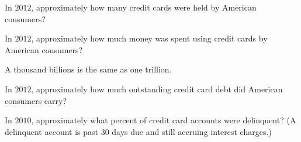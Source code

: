 \documentclass{ximera}
\begin{document}
\begin{question}
In $2012$, approximately how many credit cards were held by American consumers?
    \begin{multipleChoice}
    \end{multipleChoice}
\end{question}

\begin{question}
In $2012$, approximately how much money was spent using credit cards by American consumers?
    \begin{multipleChoice}
    \end{multipleChoice}
\end{question}

\begin{hint}
A thousand billions is the same as one trillion.
\end{hint}

\begin{question}
In $2012$, approximately how much outstanding credit card debt did American consumers carry?
 
    \begin{multipleChoice}
    \end{multipleChoice}

\end{question}

\begin{question}
In $2010$, approximately what percent of credit card accounts were delinquent? (A delinquent account is past $30$ days due and still accruing interest charges.)

    \begin{multipleChoice}
    \end{multipleChoice}

\end{question}
\end{document}
